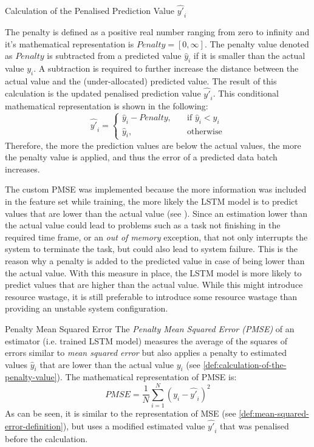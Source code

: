     \begin{pabox}{Calculation of the Penalised Prediction Value $\hat{y'}_i$}
    \label{def:calculation-of-the-penalty-value}

      The penalty is defined as a positive real number ranging from zero to infinity and it's mathematical representation is $Penalty = [0, \infty]$.
      The penalty value denoted as $Penalty$ is subtracted from a predicted value $\hat{y}_i$ if it is smaller than the actual value $y_i$. A subtraction is required to further increase the distance between the actual value and the (under-allocated) predicted value.
      The result of this calculation is the updated penalised prediction value $\hat{y'}_i$.
      This conditional mathematical representation is shown in the following:
      $$\hat{y'}_i = 
      \begin{cases}
        \hat{y}_i - Penalty, & \quad \textrm{if } \hat{y}_i < y_i \\
        \hat{y}_i,  & \quad \textrm{otherwise}
      \end{cases}$$
      Therefore, the more the prediction values are below the actual values, the more the penalty value is applied, and thus the error of a predicted data batch increases.

    \end{pabox}

    The custom PMSE was implemented because the more information was included in the feature set while training, the more likely the LSTM model is to predict values that are lower than the actual value (see ). Since an estimation lower than the actual value could lead to problems such as a task not finishing in the required time frame, or an \emph{out of memory} exception, that not only interrupts the system to terminate the task, but could also lead to system failure. This is the reason why a penalty is added to the predicted value in case of being lower than the actual value. With this measure in place, the LSTM model is more likely to predict values that are higher than the actual value. While this might introduce resource wastage, it is still preferable to introduce some resource wastage than providing an unstable system configuration.

    \begin{pabox}{Penalty Mean Squared Error}
      \label{def:penalty-mean-squared-error-definition}
      The \emph{Penalty Mean Squared Error (PMSE)} of an estimator (i.e. trained LSTM model) measures the average of the squares of errors similar to \emph{mean squared error} but also applies a penalty to estimated values $\hat{y}_i$ that are lower than the actual value $y_i$ (see \ref{def:calculation-of-the-penalty-value}). 
      The mathematical representation of PMSE is:
      $$PMSE = \frac{1}{N} \sum_{i = 1}^{N}\left(y_i - \hat{y'}_i\right)^2$$
      As can be seen, it is similar to the representation of MSE (see \ref{def:mean-squared-error-definition}), but uses a modified estimated value $\hat{y'}_i$ that was penalised before the calculation.
    \end{pabox}

